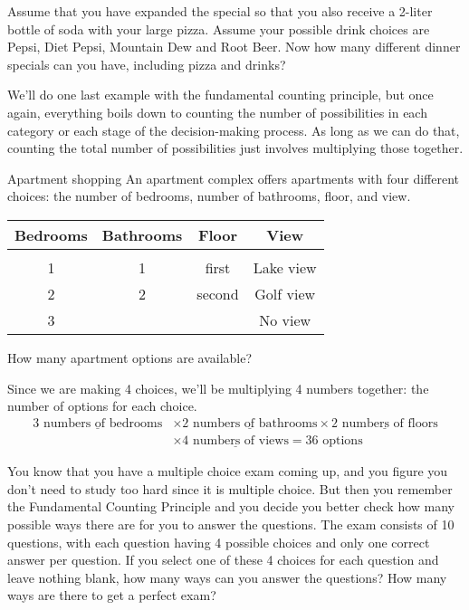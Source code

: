 \begin{try}
Assume that you have expanded the special so that you also receive a 2-liter
bottle of soda with your large pizza. Assume your possible drink choices are Pepsi, Diet
Pepsi, Mountain Dew and Root Beer. Now how many different dinner specials can you have,
including pizza and drinks?
\end{try}

We'll do one last example with the fundamental counting principle, but once again, everything boils down to counting the number of possibilities in each category or each stage of the decision-making process.  As long as we can do that, counting the total number of possibilities just involves multiplying those together.
\vfill
\pagebreak

\begin{example}[https://www.youtube.com/watch?v=oSolXixtUy0]{Apartment shopping}
An apartment complex offers apartments with four different choices: the number of bedrooms, number of bathrooms, floor, and view.
\begin{center}
\begin{tabular}{c c c c}
\textbf{Bedrooms} & \textbf{Bathrooms} & \textbf{Floor} & 	\textbf{View} \\ \hline
& & & \\
1 & 1 & first & Lake view \\ 
2 & 2 & second & Golf view \\ 
3 & & & No view\\  
\end{tabular} 
\end{center}
How many apartment options are available?

\sol
Since we are making 4 choices, we'll be multiplying 4 numbers together: the number of options for each choice.
\begin{align*}\underline{3 \textrm{ numbers of bedrooms}} &\times \underline{2 \textrm{ numbers of bathrooms}} \times \underline{2 \textrm{ numbers of floors}}\\ &\times \underline{4 \textrm{ numbers of views}} = \boxed{36 \textrm{ options}}\end{align*}
\end{example}

\begin{try}
You know that you have a multiple choice exam coming up, and you figure
you don't need to study too hard since it is multiple choice. But then you remember the
Fundamental Counting Principle and you decide you better check how many possible ways
there are for you to answer the questions. The exam consists of 10 questions, with each
question having 4 possible choices and only one correct answer per question. If you select
one of these 4 choices for each question and leave nothing blank, how many ways can you
answer the questions? How many ways are there to get a perfect exam?
\end{try}

